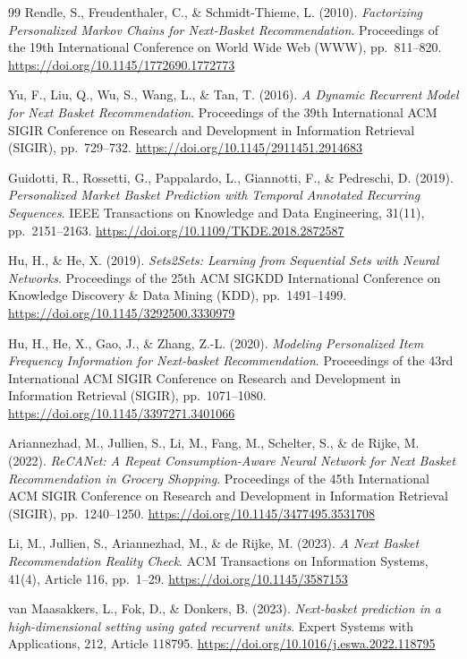 \begin{thebibliography}{99}
Rendle, S., Freudenthaler, C., \& Schmidt-Thieme, L. (2010).
\textit{Factorizing Personalized Markov Chains for Next-Basket Recommendation}.
Proceedings of the 19th International Conference on World Wide Web (WWW), pp.\ 811--820. \url{https://doi.org/10.1145/1772690.1772773}

Yu, F., Liu, Q., Wu, S., Wang, L., \& Tan, T. (2016).
\textit{A Dynamic Recurrent Model for Next Basket Recommendation}.
Proceedings of the 39th International ACM SIGIR Conference on Research and Development in Information Retrieval (SIGIR), pp.\ 729--732. \url{https://doi.org/10.1145/2911451.2914683}

Guidotti, R., Rossetti, G., Pappalardo, L., Giannotti, F., \& Pedreschi, D. (2019).
\textit{Personalized Market Basket Prediction with Temporal Annotated Recurring Sequences}.
IEEE Transactions on Knowledge and Data Engineering, 31(11), pp.\ 2151--2163. \url{https://doi.org/10.1109/TKDE.2018.2872587}

Hu, H., \& He, X. (2019).
\textit{Sets2Sets: Learning from Sequential Sets with Neural Networks}.
Proceedings of the 25th ACM SIGKDD International Conference on Knowledge Discovery \& Data Mining (KDD), pp.\ 1491--1499. \url{https://doi.org/10.1145/3292500.3330979}

Hu, H., He, X., Gao, J., \& Zhang, Z.-L. (2020).
\textit{Modeling Personalized Item Frequency Information for Next-basket Recommendation}.
Proceedings of the 43rd International ACM SIGIR Conference on Research and Development in Information Retrieval (SIGIR), pp.\ 1071--1080. \url{https://doi.org/10.1145/3397271.3401066}

Ariannezhad, M., Jullien, S., Li, M., Fang, M., Schelter, S., \& de Rijke, M. (2022).
\textit{ReCANet: A Repeat Consumption-Aware Neural Network for Next Basket Recommendation in Grocery Shopping}.
Proceedings of the 45th International ACM SIGIR Conference on Research and Development in Information Retrieval (SIGIR), pp.\ 1240--1250. \url{https://doi.org/10.1145/3477495.3531708}

Li, M., Jullien, S., Ariannezhad, M., \& de Rijke, M. (2023).
\textit{A Next Basket Recommendation Reality Check}.
ACM Transactions on Information Systems, 41(4), Article 116, pp.\ 1--29. \url{https://doi.org/10.1145/3587153}

van Maasakkers, L., Fok, D., \& Donkers, B. (2023).
\textit{Next-basket prediction in a high-dimensional setting using gated recurrent units}.
Expert Systems with Applications, 212, Article 118795. \url{https://doi.org/10.1016/j.eswa.2022.118795}


\end{thebibliography}
